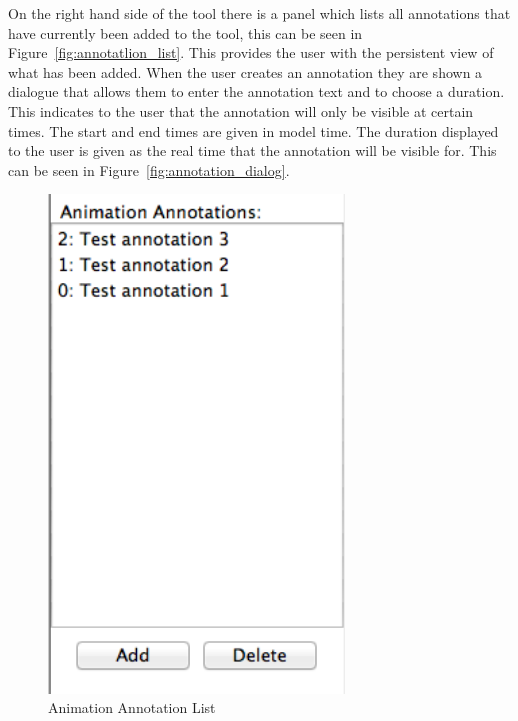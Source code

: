 On the right hand side of the tool there is a panel which lists all annotations that have currently been added to the tool, this can be seen in Figure~\ref{fig:annotatlion_list}.  This provides the user with the persistent view of what has been added.  When the user creates an annotation they are shown a dialogue that allows them to enter the annotation text and to choose a duration.  This indicates to the user that the annotation will only be visible at certain times.  The start and end times are given in model time.  The duration displayed to the user is given as the real time that the annotation will be visible for.  This can be seen in Figure~\ref{fig:annotation_dialog}.

\begin{figure}[h!]
    \centering
    \includegraphics[width=0.7\textwidth]{images/annotation_list.png}
    \caption{Animation Annotation List}
    \label{fig:annotation_list}
\end{figure}


